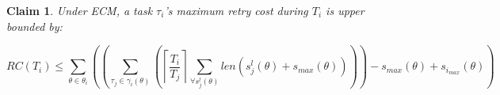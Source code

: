 \documentclass[12pt,english]{report}
\newtheorem{clm}{Claim}
\begin{document}
\begin{clm}\label{gedf-edf}
Under ECM, a task $\tau_i$'s maximum retry cost during $T_i$ is upper bounded by:
 
\begin{equation}
RC\left(T_{i}\right) \le \sum_{\theta\in\theta_{i}}\left(\left(\sum_{\tau_{j}\in\gamma_i(\theta)}\left(\left\lceil\frac{T_{i}}{T_{j}}\right\rceil\sum_{\forall s_{j}^{l}(\theta)}len\left(s_{j}^{l}(\theta) + s_{max}(\theta)\right)\right)\right)-s_{max}(\theta)+s_{i_{max}}(\theta)\right)\label{eq3}\end{equation}
 
 
\end{clm}
\end{document}
